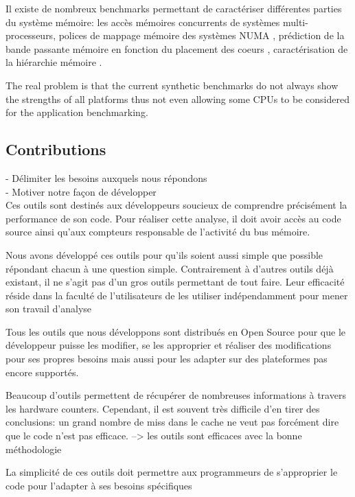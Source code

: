    Il existe de nombreux benchmarks permettant de caractériser différentes parties du système mémoire: les accès mémoires concurrents de systèmes multi-processeurs\cite{Mandal2010}, polices de mappage mémoire des systèmes NUMA \cite{Diener2015}, prédiction de la bande passante mémoire en fonction du placement des coeurs \cite{Wang2016a}, caractérisation de la hiérarchie mémoire \cite{Cooper2011}.
    
    The real problem is that the current synthetic benchmarks do not always show the strengths of all platforms thus not even allowing some CPUs to be considered for the application benchmarking.
    
    
\subsection{Contributions}

- Délimiter les besoins auxquels nous répondons\\
- Motiver notre façon de développer\\

    Ces outils sont destinés aux développeurs soucieux de comprendre précisément la performance de son code. Pour réaliser cette analyse, il doit avoir accès au code source ainsi qu'aux compteurs responsable de l’activité du bus mémoire.
    
    Nous avons développé ces outils pour qu'ils soient aussi simple que possible répondant chacun à une question simple. Contrairement à d’autres outils déjà existant, il ne s'agit pas d’un gros outils permettant de tout faire. Leur efficacité réside dans la faculté de l’utilisateurs de les utiliser indépendamment pour mener son travail d'analyse

    Tous les outils que nous développons sont distribués en Open Source pour que le développeur puisse les modifier, se les approprier et réaliser des modifications pour ses propres besoins mais aussi pour les adapter sur des plateformes pas encore supportés.
    
    Beaucoup d’outils permettent de récupérer de nombreuses informations à travers les hardware counters. Cependant, il est souvent très difficile d’en tirer des conclusions: un grand nombre de miss dans le cache ne veut pas forcément dire que le code n’est pas efficace.
            --> les outils sont efficaces avec la bonne méthodologie
     
    La simplicité de ces outils doit permettre aux programmeurs de s’approprier le code pour l’adapter à ses besoins spécifiques 
    
